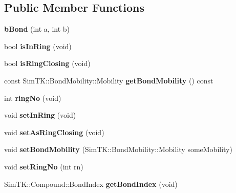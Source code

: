 \subsection*{Public Member Functions}
\begin{DoxyCompactItemize}
\item 
{\bfseries b\+Bond} (int a, int b)\hypertarget{classbBond_a1cda4467d17196755fb22093830f4d40}{}\label{classbBond_a1cda4467d17196755fb22093830f4d40}

\item 
bool {\bfseries is\+In\+Ring} (void)\hypertarget{classbBond_a7b050c59b5ca77c66bda45c344487236}{}\label{classbBond_a7b050c59b5ca77c66bda45c344487236}

\item 
bool {\bfseries is\+Ring\+Closing} (void)\hypertarget{classbBond_a45c45e0a9f77bb8d4ecf2f61a14e5d1d}{}\label{classbBond_a45c45e0a9f77bb8d4ecf2f61a14e5d1d}

\item 
const Sim\+T\+K\+::\+Bond\+Mobility\+::\+Mobility {\bfseries get\+Bond\+Mobility} () const \hypertarget{classbBond_a3e91f9e1c87dc954a29e35dee1212638}{}\label{classbBond_a3e91f9e1c87dc954a29e35dee1212638}

\item 
int {\bfseries ring\+No} (void)\hypertarget{classbBond_a1ee34276aab47e506f232d040fb0c32a}{}\label{classbBond_a1ee34276aab47e506f232d040fb0c32a}

\item 
void {\bfseries set\+In\+Ring} (void)\hypertarget{classbBond_a12acb32aad78703b8aab53626eac2680}{}\label{classbBond_a12acb32aad78703b8aab53626eac2680}

\item 
void {\bfseries set\+As\+Ring\+Closing} (void)\hypertarget{classbBond_abc744708c12f75f917f4d9d881829978}{}\label{classbBond_abc744708c12f75f917f4d9d881829978}

\item 
void {\bfseries set\+Bond\+Mobility} (Sim\+T\+K\+::\+Bond\+Mobility\+::\+Mobility some\+Mobility)\hypertarget{classbBond_a9bdeb22d5e5edd5e5aaf126c9ccbe7c8}{}\label{classbBond_a9bdeb22d5e5edd5e5aaf126c9ccbe7c8}

\item 
void {\bfseries set\+Ring\+No} (int rn)\hypertarget{classbBond_ad0489880ce030239bbef3768b23dfa6d}{}\label{classbBond_ad0489880ce030239bbef3768b23dfa6d}

\item 
Sim\+T\+K\+::\+Compound\+::\+Bond\+Index {\bfseries get\+Bond\+Index} (void)\hypertarget{classbBond_ad60a8e3207a98bcf593eb30441f1ce24}{}\label{classbBond_ad60a8e3207a98bcf593eb30441f1ce24}


\end{DoxyCompactItemize}
